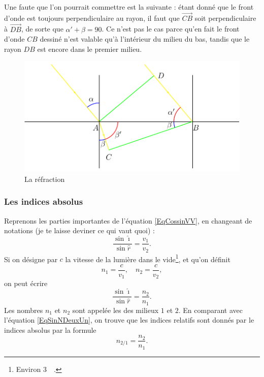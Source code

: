 Une faute que l'on pourrait commettre est la suivante : étant donné que le front d'onde est toujours perpendiculaire au rayon, il faut que $\overrightarrow{CB}$ soit perpendiculaire à $\overrightarrow{DB}$, de sorte que $\alpha'+\beta=90$. Ce n'est pas le cas parce qu'en fait le front d'onde $CB$ dessiné n'est valable qu'à l'intérieur du milieu du bas, tandis que le rayon $DB$ est encore dans le premier milieu.

\begin{figure}
    \includegraphics{fig1617_1.png}
\caption{La réfraction}\label{figRefracGeom}
\end{figure}

\subsubsection{Les indices absolus}

Reprenons les parties importantes de l'équation \eqref{EqCossinVV}, en changeant de notations (je te laisse deviner ce qui vaut quoi) :
\begin{equation}
\frac{ \sin\hat\imath }{ \sin\hat r }=\frac{ v_{1} }{ v_{2} }.
\end{equation}
Si on désigne par $c$ la vitesse de la lumière dans le vide\footnote{Environ \unit{3\cdot{}}{\meter\per\second}.}, et qu'on définit
\[ 
 n_{1}=\frac{ c }{ v_{1} },\quad n_{2}=\frac{ c }{ v_{2} },
\]
on peut écrire
\begin{equation}   \label{EqFormSnell}
\frac{ \sin\hat\imath }{ \sin\hat r }=\frac{ n_{2} }{ n_{1} }.
\end{equation}
Les nombres $n_{1}$ et $n_{2}$ sont appelée les  des milieux $1$ et $2$. En comparant avec l'équation \eqref{EqSinNDeuxUn}, on trouve que les indices relatifs sont donnés par le indices absolus par la formule
\[ 
  n_{2/1}=\frac{ n_{2} }{ n_{1} }.
\]

